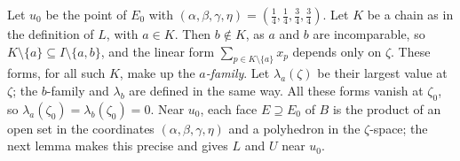\documentclass[11pt]{article}
\theoremstyle{definition}
\theoremstyle{remark}
\begin{document}
Let $u_0$ be the point of $E_0$ with
$(\alpha,\beta,\gamma,\eta)=(\frac14,\frac14,\frac34,\frac34)$. Let $K$ be a chain as in the definition of $L$, with $a\in K$. Then $b\notin K$, as $a$ and $b$ are incomparable, so $K\setminus\{a\}\subseteq I\setminus\{a,b\}$, and the linear form $\sum_{p\in K\setminus\{a\}}x_p$ depends only on $\zeta$. These forms, for all such $K$, make up the \emph{$a$-family}. Let $\lambda_a(\zeta)$ be their largest value at $\zeta$; the $b$-family and $\lambda_b$ are defined in the same way. All these forms vanish at
$\zeta_0$, so $\lambda_a(\zeta_0)=\lambda_b(\zeta_0)=0$. Near $u_0$, each face $E\supseteq E_0$ of $B$ is the product of an open
set in the coordinates $(\alpha,\beta,\gamma,\eta)$ and a polyhedron in the $\zeta$-space; the next lemma makes this precise
and gives $L$ and $U$ near $u_0$.
\end{document}
